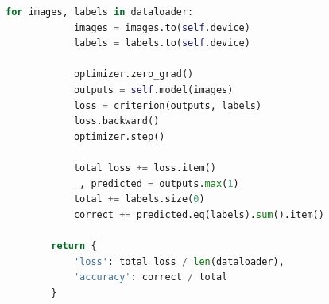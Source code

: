 \documentclass[12pt,a4paper]{report}
\begin{document}
\begin{lstlisting}[language=Python, caption=Visual Phishing Classifier]
        for images, labels in dataloader:
            images = images.to(self.device)
            labels = labels.to(self.device)
            
            optimizer.zero_grad()
            outputs = self.model(images)
            loss = criterion(outputs, labels)
            loss.backward()
            optimizer.step()
            
            total_loss += loss.item()
            _, predicted = outputs.max(1)
            total += labels.size(0)
            correct += predicted.eq(labels).sum().item()
        
        return {
            'loss': total_loss / len(dataloader),
            'accuracy': correct / total
        }
\end{lstlisting}
\end{document}
